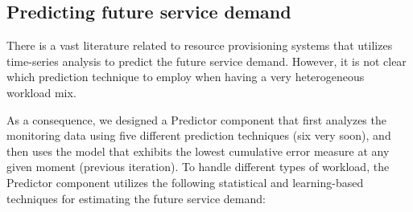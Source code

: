 \subsection{Predicting future service demand}
There is a vast literature related to resource provisioning systems that utilizes time-series analysis to predict the future service demand. However, it is not clear which prediction technique to employ when having a very heterogeneous workload mix. 

As a consequence, we designed a Predictor component that first analyzes the monitoring data using five different prediction techniques (six very soon), and then uses the model that exhibits the lowest cumulative error measure at any given moment (previous iteration). To handle different types of workload, the Predictor component utilizes the following statistical  and learning-based techniques for estimating the future service demand:

